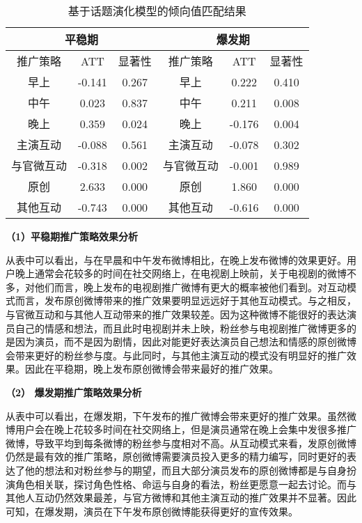 \begin{table}[!htbp]
\centering
\caption{基于话题演化模型的倾向值匹配结果}
\label{res1}
\begin{tabular}{|c|c|c|c|c|c|} \hline
\multicolumn{3}{|c|}{平稳期}& \multicolumn{3}{c|}{爆发期}\\ \hline
推广策略 & ATT & 显著性& 推广策略 & ATT & 显著性\\ \hline
早上 & -0.141 & 0.267& 早上 & 0.222 & 0.410\\%
中午 & 0.023 & 0.837 & 中午 & 0.211 & 0.008\\%
晚上 & 0.359 & 0.024 & 晚上 & -0.176 & 0.004\\ \hline
主演互动 & -0.088 & 0.561 &  主演互动 & -0.078 & 0.302\\
与官微互动& -0.318 & 0.002 & 与官微互动 & -0.001 & 0.989\\%
原创& 2.633 & 0.000 & 原创& 1.860 & 0.000\\
其他互动& -0.743 & 0.000 & 其他互动 & -0.616 & 0.000\\ \hline
\end{tabular}
\end{table}

\textbf{（1）平稳期推广策略效果分析}

从表中可以看出，与在早晨和中午发布微博相比，在晚上发布微博的效果更好。用户晚上通常会花较多的时间在社交网络上，在电视剧上映前，关于电视剧的微博不多，对他们而言，晚上发布的电视剧推广微博有更大的概率被他们看到。对互动模式而言，发布原创微博带来的推广效果要明显远远好于其他互动模式。与之相反，与官微互动和与其他人互动带来的推广效果较差。因为这种微博不能很好的表达演员自己的情感和想法，而且此时电视剧并未上映，粉丝参与电视剧推广微博更多的是因为演员，而不是因为剧情，因此对能更好表达演员自己想法和情感的原创微博会带来更好的粉丝参与度。与此同时，与其他主演互动的模式没有明显好的推广效果。因此在平稳期，晚上发布原创微博会带来最好的推广效果。

\textbf{（2） 爆发期推广策略效果分析}

从表中可以看出，在爆发期，下午发布的推广微博会带来更好的推广效果。虽然微博用户会在晚上花较多时间在社交网络上，但是演员通常在晚上会集中发很多推广微博，导致平均到每条微博的粉丝参与度相对不高。从互动模式来看，发原创微博仍然是最有效的推广策略，原创微博需要演员投入更多的精力编写，同时更好的表达了他的想法和对粉丝参与的期望，而且大部分演员发布的原创微博都是与自身扮演角色相关联，探讨角色性格、命运与自身的看法，粉丝更愿意一起去讨论。而与其他人互动仍然效果最差，与官方微博和其他主演互动的推广效果并不显著。因此可知，在爆发期，演员在下午发布原创微博能获得更好的宣传效果。

